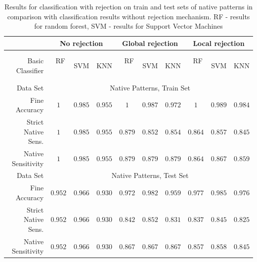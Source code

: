 \documentclass{llncs}
\begin{document}
\begin{table}[h]
\centering
\caption{Results for classification with rejection on train and test sets of native patterns in comparison with classification results without rejection mechanism. RF - results for random forest, SVM - results for Support Vector Machines
}
\setlength{\tabcolsep}{3pt}
\renewcommand{\arraystretch}{1}
{\footnotesize
\begin{tabular}{|r||c|c|c||c|c|c||c|c|c|}
\hline
& \multicolumn{3}{c||}{No rejection} & \multicolumn{3}{c||}{Global rejection} & \multicolumn{3}{c|}{Local rejection}\\
\hline
  Basic Classifier & $\;\;$RF$\;\;$ & $\,$SVM$\,$ & KNN & $\;\;$RF$\;\;$ & $\,$SVM$\,$ & KNN & $\;\;$RF$\;\;$ & $\,$SVM$\,$ & KNN  \\
  \hline
  Data Set & \multicolumn{9}{c|}{Native Patterns, Train Set} \\
\hline
Fine Accuracy       & $1$ & $0.985$ & $0.955$ & $1$     & $0.987$ & $0.972$ & $1$ & $0.989$ & $0.984$ \\
Strict Native Sens. & $1$ & $0.985$ & $0.955$ & $0.879$ & $0.852$ & $0.854$ & $0.864$ & $0.857$ & $0.845$ \\
Native Sensitivity  & $1$ & $0.985$ & $0.955$ & $0.879$ & $0.879$ & $0.879$ & $0.864$ & $0.867$ & $0.859$ \\
\hline
  Data Set & \multicolumn{9}{c|}{Native Patterns, Test Set} \\
\hline
Fine Accuracy       & $0.952$ & $0.966$ & $0.930$ & $0.972$ & $0.982$ & $0.959$ & $0.977$ & $0.985$ & $0.976$ \\
Strict Native Sens. & $0.952$ & $0.966$ & $0.930$ & $0.842$ & $0.852$ & $0.831$ & $0.837$ & $0.845$ & $0.825$ \\
Native Sensitivity  & $0.952$ & $0.966$ & $0.930$ & $0.867$ & $0.867$ & $0.867$ & $0.857$ & $0.858$ & $0.845$ \\
\hline
\end{tabular}
}


\vspace{-6pt}
\label{tab:NativeNoForeign}
\end{table}
\end{document}
